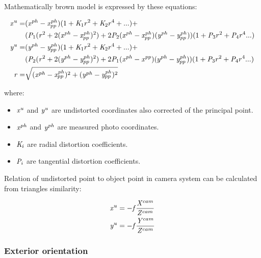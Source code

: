 \documentclass[a4paper,12pt]{article}
\newcommand{\escal}[1]{
{\it #1}
}
\begin{document}
Mathematically brown model is expressed by these equations:

\begin{equation}
\label{eq:undistort}
\begin{split}
\escal{x}^{u} =& (\escal{x}^{ph} - \escal{x}^{ph}_{pp})(1 + \escal{K}_{1}r^2 + \escal{K}_2r^4 + ...) + \\
&(\escal{P}_1(\escal{r}^2 + 2(\escal{x}^{ph} - \escal{x}^{ph}_{pp})^2) + 2\escal{P}_2(\escal{x}^{ph} - \escal{x}^{ph}_{pp})(\escal{y}^{ph} - \escal{y}^{ph}_{pp}))(1 + \escal{P}_3r^2 + \escal{P}_4r^4 ...) \\
\escal{y}^{u} =& (\escal{y}^{ph} - \escal{y}^{ph}_{pp})(1 + \escal{K}_1r^2 + \escal{K}_2r^4 + ...) + \\
&(\escal{P}_2(\escal{r}^2 + 2(\escal{y}^{ph} - \escal{y}^{ph}_{pp})^2) + 2\escal{P}_1(\escal{x}^{ph} - \escal{x}^{pp})(y^{ph} - \escal{y}^{ph}_{pp}))(1 + \escal{P}_3r^2 + \escal{P}_4r^4 ...) \\
\escal{r} =& \sqrt{(\escal{x}^{ph} - \escal{x}^{ph}_{pp})^2 + (\escal{y}^{ph} - \escal{y}^{ph}_{pp})^2}
\end{split}
\end{equation}

where:

\begin{itemize}
  \item $\escal{x}^{u}$ and $\escal{y}^{u}$  are undistorted coordinates also corrected of the principal point.
  \item $\escal{x}^{ph}$ and $\escal{y}^{ph}$ are measured photo coordinates.
  \item $\escal{K}_{i}$ are radial distortion coefficients.
  \item $\escal{P}_{i}$ are tangential distortion coefficients.
\end{itemize}


Relation of undistorted point to object point in camera system can be calculated from 
triangles similarity:

\begin{equation}
\begin{split}
&\escal{x}^{u} =  - \escal{f} \frac{\escal{X}^{cam}}{\escal{Z}^{cam}}   \\
&\escal{y}^{u} = - \escal{f} \frac{\escal{Y}^{cam}}{\escal{Z}^{cam}} 
\end{split}
\end{equation}


\subsubsection{Exterior orientation}
\end{document}
